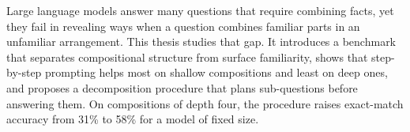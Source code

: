Large language models answer many questions that require combining facts, yet they fail in
revealing ways when a question combines familiar parts in an unfamiliar arrangement. This
thesis studies that gap. It introduces a benchmark that separates compositional structure from
surface familiarity, shows that step-by-step prompting helps most on shallow compositions and
least on deep ones, and proposes a decomposition procedure that plans sub-questions before
answering them. On compositions of depth four, the procedure raises exact-match accuracy from
31\% to 58\% for a model of fixed size.
